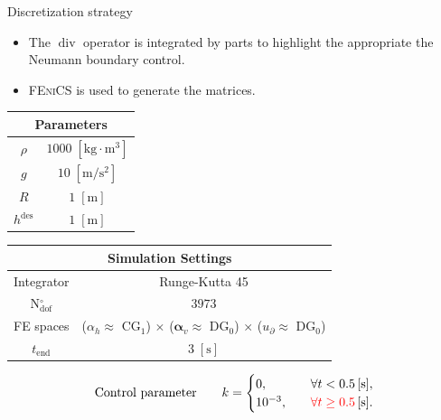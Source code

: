 \documentclass[aspectratio=169]{ISAE-Beamer}
\renewcommand{\div}{\operatorname{div}}
\newcommand{\fenics}{\textsc{FEniCS}\xspace}
\begin{document}
\begin{frame}{Discretization strategy}
\begin{itemize}
\item The $\div$ operator is integrated by parts to highlight the appropriate the Neumann boundary control.
\item \fenics is used to generate the matrices.
\end{itemize}

\begin{table}[th]
	\centering
	\begin{tabular}{|c|c|}
		\hline 
		\multicolumn{2}{|c|}{Parameters} \\ 
		\hline 
		$\rho$ & $1000\; \mathrm{[kg \cdot m^3]}$ \\ 
		$g$& $10\; \mathrm{[m/s^2]}$ \\ 
		$R$& $1\; \mathrm{[m]}$\\ 
		$h^{\text{des}}$& $1\; \mathrm{[m]}$ \\ 
		\hline 
	\end{tabular} \hspace{.3cm}
	\begin{tabular}{|c|c|}
		\hline 
		\multicolumn{2}{|c|}{Simulation Settings} \\
		\hline 
		Integrator & Runge-Kutta 45 \\
		N$_{\text{dof}}^\circ$ & $3973$ \\
		FE spaces & ($\alpha_h\approx$ CG$_1$) $\times$ ($\bm{\alpha}_v\approx$ DG$_0$) $\times$ ($u_\partial\approx$ DG$_0$)\\
		$t_{\text{end}}$ & $3\; \mathrm{[s]}$\\ 
		\hline 
	\end{tabular} 
\end{table}
\vspace{.5cm}
\begin{equation*}
\text{Control parameter} \qquad 
k = 
\begin{cases}
0, \quad & \forall t < 0.5 \, [\mathrm{s}], \\
10^{-3}, \quad & \textcolor{red}{\forall t \ge 0.5} \, [\mathrm{s}].
\end{cases}
\end{equation*}
		
\end{frame}
\end{document}
